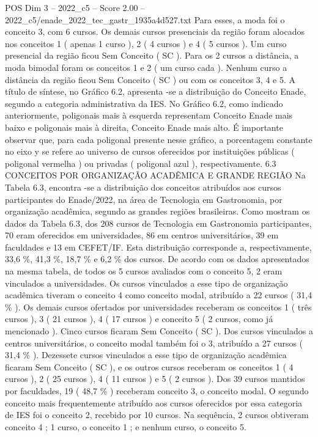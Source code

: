 \begin{textsample}{POS Dim 3 – 2022\_c5 – Score 2.00 – 2022\_c5/enade\_2022\_tec\_gastr\_1935a4d527.txt}
Para esses, a moda foi o conceito 3, com 6 cursos.
Os demais cursos presenciais da região foram alocados nos conceitos 1 ( apenas 1 curso ), 2 ( 4 cursos ) e 4 ( 5 cursos ).
Um curso presencial da região ficou Sem Conceito ( SC ).
Para os 2 cursos a distância, a moda bimodal foram os conceitos 1 e 2 ( um curso cada ).
Nenhum curso a distância da região ficou Sem Conceito ( SC ) ou com os conceitos 3, 4 e 5.
A título de síntese, no Gráfico 6.2, apresenta -se a distribuição do Conceito Enade, segundo a categoria administrativa da IES.
No Gráfico 6.2, como indicado anteriormente, poligonais mais à esquerda representam Conceito Enade mais baixo e poligonais mais à direita, Conceito Enade mais alto.
É importante observar que, para cada poligonal presente nesse gráfico, a porcentagem constante no eixo y se refere ao universo de cursos oferecidos por instituições públicas ( poligonal vermelha ) ou privadas ( poligonal azul ), respectivamente. 6.3 CONCEITOS POR ORGANIZAÇÃO ACADÊMICA E GRANDE REGIÃO Na Tabela 6.3, encontra -se a distribuição dos conceitos atribuídos aos cursos participantes do Enade/2022, na área de Tecnologia em Gastronomia, por organização acadêmica, segundo as grandes regiões brasileiras.
Como mostram os dados da Tabela 6.3, dos 208 cursos de Tecnologia em Gastronomia participantes, 70 eram oferecidos em universidades, 86 em centros universitários, 39 em faculdades e 13 em CEFET/IF.
Esta distribuição corresponde a, respectivamente, 33,6 \%, 41,3 \%, 18,7 \% e 6,2 \% dos cursos.
De acordo com os dados apresentados na mesma tabela, de todos os 5 cursos avaliados com o conceito 5, 2 eram vinculados a universidades.
Os cursos vinculados a esse tipo de organização acadêmica tiveram o conceito 4 como conceito modal, atribuído a 22 cursos ( 31,4 \% ).
Os demais cursos ofertados por universidades receberam os conceitos 1 ( três cursos ), 3 ( 21 cursos ), 4 ( 17 cursos ) e conceito 5 ( 2 cursos, como já mencionado ).
Cinco cursos ficaram Sem Conceito ( SC ).
Dos cursos vinculados a centros universitários, o conceito modal também foi o 3, atribuído a 27 cursos ( 31,4 \% ).
Dezessete cursos vinculados a esse tipo de organização acadêmica ficaram Sem Conceito ( SC ), e os outros cursos receberam os conceitos 1 ( 4 cursos ), 2 ( 25 cursos ), 4 ( 11 cursos ) e 5 ( 2 cursos ).
Dos 39 cursos mantidos por faculdades, 19 ( 48,7 \% ) receberam conceito 3, o conceito modal.
O segundo conceito mais frequentemente atribuído aos cursos oferecidos por essa categoria de IES foi o conceito 2, recebido por 10 cursos.
Na sequência, 2 cursos obtiveram conceito 4 ; 1 curso, o conceito 1 ; e nenhum curso, o conceito 5.

\end{textsample}

